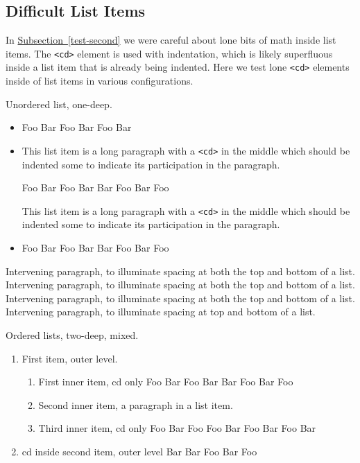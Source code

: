 \documentclass[pdflatex]{sn-jnl}
\theoremstyle{thmstyleone}%
\theoremstyle{thmstyletwo}%
\theoremstyle{thmstylethree}%
\newcommand{\xreffont}{\relax}
\newcommand{\mono}[1]{\texttt{#1}}
\numberwithin{equation}{section}
\begin{document}
\subsection{Difficult List Items}\label{section-lists-6}%
In \hyperref[test-second]{Subsection~{\xreffont\ref{test-second}}} we were careful about lone bits of math inside list items.  The \mono{<cd>} element is used with indentation, which is likely superfluous inside a list item that is already being indented.  Here we test lone \mono{<cd>} elements inside of list items in various configurations.%
\par
Unordered list, one-deep.%
\begin{itemize}[label=\textbullet]
\item{}%
\begin{codedisplayleft}
Foo Bar Foo
Bar Foo Bar
\end{codedisplayleft}
%
\item{}This list item is a long paragraph with a \mono{<cd>} in the middle which should be indented some to indicate its participation in the paragraph.%
\begin{codedisplay}
Foo Bar Foo
Bar
Bar Foo Bar
Foo
\end{codedisplay}
This list item is a long paragraph with a \mono{<cd>} in the middle which should be indented some to indicate its participation in the paragraph.%
\item{}%
\begin{codedisplayleft}
Foo Bar Foo
Bar
Bar Foo Bar
Foo
\end{codedisplayleft}
%
\end{itemize}
%
\par
Intervening paragraph, to illuminate spacing at both the top and bottom of a list.  Intervening paragraph, to illuminate spacing at both the top and bottom of a list.  Intervening paragraph, to illuminate spacing at both the top and bottom of a list.  Intervening paragraph, to illuminate spacing at top and bottom of a list.%
\par
Ordered lists, two-deep, mixed.%
\begin{enumerate}
\item{}First item, outer level.%
\begin{enumerate}
\item{}%
\begin{codedisplayleft}
First inner item, cd only
Foo Bar Foo
Bar
Bar Foo Bar
Foo
\end{codedisplayleft}
%
\item{}Second inner item, a paragraph in a list item.%
\item{}%
\begin{codedisplayleft}
Third inner item, cd only
Foo Bar Foo
Foo Bar Foo
Bar Foo Bar
\end{codedisplayleft}
%
\end{enumerate}
%
\item{}%
\begin{codedisplayleft}
cd inside second item, outer level
Bar
Bar Foo Bar
Foo
\end{codedisplayleft}
%
\end{enumerate}
\end{document}
